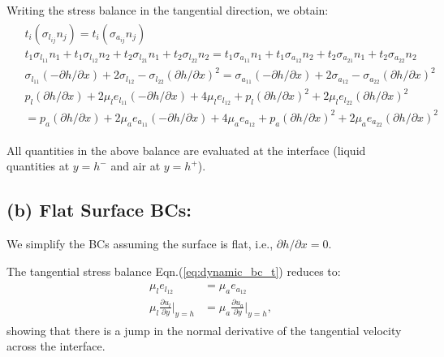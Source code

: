 \documentclass{article}
\begin{document}
\begin{enumerate}
Writing the stress balance in the tangential direction, we obtain:
\begin{align}\label{eq:dynamic_bc_t}
 \begin{split}
  & t_{i}(\sigma_{l_{ij}} n_{j}) = t_{i}(\sigma_{a_{ij}} n_{j})\\
  & t_{1} \sigma_{l_{11}} n_{1} + t_{1} \sigma_{l_{12}} n_{2} + t_{2} \sigma_{l_{21}} n_{1} + t_{2} \sigma_{l_{22}} n_{2} =  t_{1} \sigma_{a_{11}}n_{1} + t_{1} \sigma_{a_{12}} n_{2} + t_{2} \sigma_{a_{21}} n_{1} + t_{2} \sigma_{a_{22}} n_{2} \\
  & \sigma_{l_{11}}(-\partial h/ \partial x) + 2 \sigma_{l_{12}} - \sigma_{l_{22}}(\partial h/ \partial x)^{2} = \sigma_{a_{11}}(-\partial h/ \partial x) + 2 \sigma_{a_{12}} - \sigma_{a_{22}}(\partial h/ \partial x)^{2}\\
  & p_{l}(\partial h/ \partial x) + 2 \mu_{l}e_{l_{11}}(-\partial h/ \partial x) + 4 \mu_{l} e_{l_{12}} + p_{l}(\partial h/ \partial x)^{2} + 2\mu_{l}e_{l_{22}}(\partial h/ \partial x)^{2} \\
  &= p_{a}(\partial h/ \partial x) + 2 \mu_{a}e_{a_{11}}(-\partial h/ \partial x) + 4 \mu_{a} e_{a_{12}} + p_{a}(\partial h/ \partial x)^{2} + 2\mu_{a}e_{a_{22}}(\partial h/ \partial x)^{2}
 \end{split}
\end{align}

All quantities in the above balance are evaluated at the interface (liquid quantities at $y=h^{-}$ and air at $y = h^{+}$).
\end{enumerate}
\subsection*{(b) Flat Surface BCs:}
We simplify the BCs assuming the surface is flat, i.e., $\partial h/ \partial x = 0$.

The tangential stress balance Eqn.(\ref{eq:dynamic_bc_t}) reduces to:
\begin{align}\label{eq:simplify_dynamic_bc_t}
 \begin{split}
  \mu_{l} e_{l_{12}} &= \mu_{a} e_{a_{12}}\\
  \mu_{l} \frac{\partial u_{l}}{\partial y}\bigg|_{y = h} &= \mu_{a} \frac{\partial u_{a}}{\partial y}\bigg|_{y = h},
 \end{split}
\end{align}
showing that there is a jump in the normal derivative of the tangential velocity across the interface.
\end{document}

